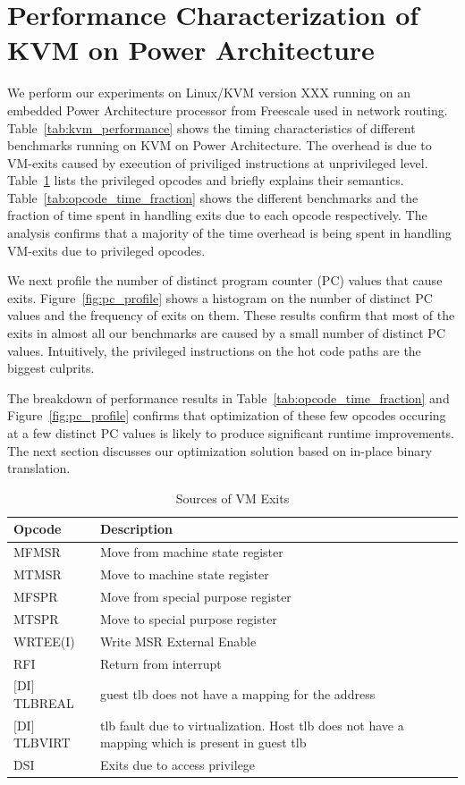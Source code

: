 \documentclass[10pt,twocolumn]{article}
\begin{document}
\section{Performance Characterization of KVM on Power Architecture}
\label{sec:performance_char}
We perform our experiments on Linux/KVM version XXX running on an
embedded Power Architecture processor from Freescale used in network
routing.
Table~\ref{tab:kvm_performance} shows the timing characteristics of
different benchmarks running on KVM on Power Architecture. The
overhead is due to VM-exits caused by execution of priviliged instructions
at unprivileged level. Table~\ref{tab:priv_opcodes} lists the privileged
opcodes and briefly explains their semantics.
Table~\ref{tab:opcode_time_fraction} shows
the different benchmarks and the fraction of time spent in handling
exits due to each opcode respectively. The analysis confirms that a
majority of the time overhead is being spent in handling VM-exits due
to privileged opcodes.

We next profile the number of distinct program counter (PC) values that
cause exits. Figure~\ref{fig:pc_profile} shows a histogram on the number
of distinct PC values and the frequency of exits on them. These results
confirm that most of the exits in almost all our benchmarks are caused
by a small number of distinct PC values. Intuitively, the privileged
instructions on the hot code paths are the biggest culprits.

The breakdown of performance results in Table~\ref{tab:opcode_time_fraction}
and Figure~\ref{fig:pc_profile} confirms that optimization of these
few opcodes occuring at a few distinct PC values is likely to produce
significant runtime improvements. The next section discusses our
optimization solution based on in-place binary translation.

\begin{table}[!b]
\centering
\caption{Sources of VM Exits}
     \begin{tabular}{|l | p{5cm} |} \hline
       Opcode \verb, , & Description \\ \hline
       MFMSR & Move from machine state register \\ \hline
       MTMSR & Move to machine state register \\\hline
	   MFSPR & Move from special purpose register \\\hline
	   MTSPR & Move to special purpose register \\\hline
	   WRTEE(I) & Write MSR External Enable  \\\hline
	   RFI & Return from interrupt \\\hline
	   $[$DI$]$TLBREAL & guest tlb does not have a mapping for the address\\\hline
	   $[$DI$]$TLBVIRT & tlb fault due to virtualization. Host tlb does not have a mapping which is present in guest tlb \\    \hline
   	   DSI & Exits due to access privilege \\\hline

     \end{tabular}
\label{tab:priv_opcodes}
\end{table}
\end{document}
